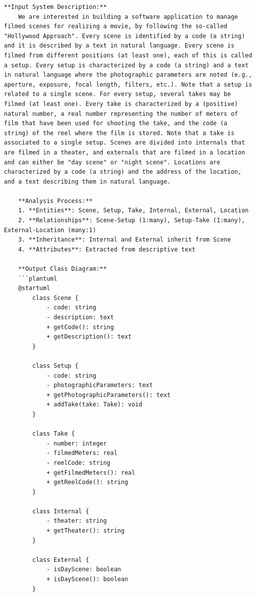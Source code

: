 \begin{lstlisting}[caption={Few-shot Chain-of-thought  Prompt}, label={lst:Few_shot_Chain_of_thought_Prompt},basicstyle=\ttfamily\tiny]
    **Input System Description:**
    We are interested in building a software application to manage filmed scenes for realizing a movie, by following the so-called "Hollywood Approach". Every scene is identified by a code (a string) and it is described by a text in natural language. Every scene is filmed from different positions (at least one), each of this is called a setup. Every setup is characterized by a code (a string) and a text in natural language where the photographic parameters are noted (e.g., aperture, exposure, focal length, filters, etc.). Note that a setup is related to a single scene. For every setup, several takes may be filmed (at least one). Every take is characterized by a (positive) natural number, a real number representing the number of meters of film that have been used for shooting the take, and the code (a string) of the reel where the film is stored. Note that a take is associated to a single setup. Scenes are divided into internals that are filmed in a theater, and externals that are filmed in a location and can either be "day scene" or "night scene". Locations are characterized by a code (a string) and the address of the location, and a text describing them in natural language.

    **Analysis Process:**
    1. **Entities**: Scene, Setup, Take, Internal, External, Location
    2. **Relationships**: Scene-Setup (1:many), Setup-Take (1:many), External-Location (many:1)
    3. **Inheritance**: Internal and External inherit from Scene
    4. **Attributes**: Extracted from descriptive text

    **Output Class Diagram:**
    ```plantuml
    @startuml
        class Scene {
            - code: string
            - description: text
            + getCode(): string
            + getDescription(): text
        }
        
        class Setup {
            - code: string
            - photographicParameters: text
            + getPhotographicParameters(): text
            + addTake(take: Take): void
        }
        
        class Take {
            - number: integer
            - filmedMeters: real
            - reelCode: string
            + getFilmedMeters(): real
            + getReelCode(): string
        }
        
        class Internal {
            - theater: string
            + getTheater(): string
        }
        
        class External {
            - isDayScene: boolean
            + isDayScene(): boolean
        }
        

\end{lstlisting}
